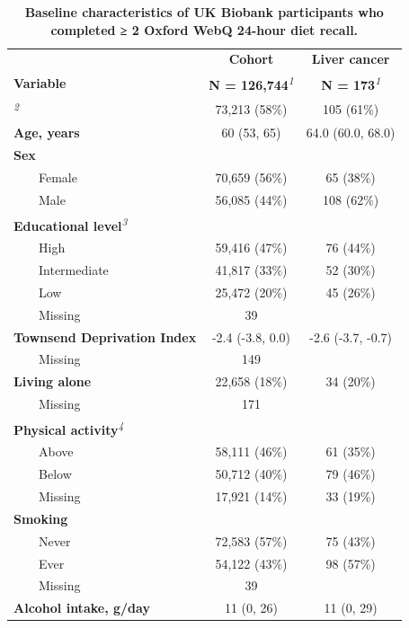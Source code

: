 \documentclass[sn-basic,Numbered,iicol,pdflatex]{sn-jnl}
\begin{document}
\begin{table}[!t]
\caption{{\small \textbf{Baseline characteristics of UK Biobank participants who completed ≥ 2 Oxford WebQ 24-hour diet recall.}}}\label{tab1}
\begin{tabular*}{1\linewidth}{@{\extracolsep{\fill}}lcc}
\toprule
 & \textbf{Cohort} & \textbf{Liver cancer} \\ 
\cmidrule(lr){2-2} \cmidrule(lr){3-3}
\textbf{Variable} & \textbf{N = 126,744}\textsuperscript{\textit{1}} & \textbf{N = 173}\textsuperscript{\textit{1}} \\ 
\midrule\addlinespace[2.5pt]
{\bfseries Typical diet yesterday}\textsuperscript{\textit{2}} & 73,213 (58\%) & 105 (61\%) \\ 
{\bfseries Age, years} & 60 (53, 65) & 64.0 (60.0, 68.0) \\ 
{\bfseries Sex} &  &  \\ 
    Female & 70,659 (56\%) & 65 (38\%) \\ 
    Male & 56,085 (44\%) & 108 (62\%) \\ 
{\bfseries Educational level}\textsuperscript{\textit{3}} &  &  \\ 
    High & 59,416 (47\%) & 76 (44\%) \\ 
    Intermediate & 41,817 (33\%) & 52 (30\%) \\ 
    Low & 25,472 (20\%) & 45 (26\%) \\ 
    Missing & 39 &  \\ 
{\bfseries Townsend Deprivation Index} & -2.4 (-3.8, 0.0) & -2.6 (-3.7, -0.7) \\ 
    Missing & 149 &  \\ 
{\bfseries Living alone} & 22,658 (18\%) & 34 (20\%) \\ 
    Missing & 171 &  \\ 
{\bfseries Physical activity}\textsuperscript{\textit{4}} &  &  \\ 
    Above & 58,111 (46\%) & 61 (35\%) \\ 
    Below & 50,712 (40\%) & 79 (46\%) \\ 
    Missing & 17,921 (14\%) & 33 (19\%) \\ 
{\bfseries Smoking} &  &  \\ 
    Never & 72,583 (57\%) & 75 (43\%) \\ 
    Ever & 54,122 (43\%) & 98 (57\%) \\ 
    Missing & 39 &  \\ 
{\bfseries Alcohol intake, g/day} & 11 (0, 26) & 11 (0, 29) \\ 

\end{tabular*}
\end{table}
\end{document}
